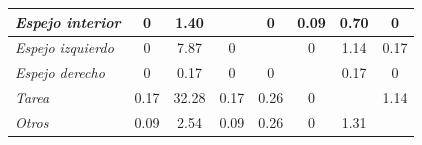\begin{table}[h]
\begin{tabular}{|lccccccc|}
\multicolumn{1}{|l|}{\textit{Espejo interior}}                                                & \multicolumn{1}{c|}{\cellcolor[HTML]{FCFCFF}0}                                           & \multicolumn{1}{c|}{\cellcolor[HTML]{F6F8FE}1.40}  & \multicolumn{1}{c|}{\cellcolor[HTML]{C9C9C9}}                                            & \multicolumn{1}{c|}{\cellcolor[HTML]{FCFCFF}0}                                            & \multicolumn{1}{c|}{\cellcolor[HTML]{FCFCFF}0.09}                                       & \multicolumn{1}{c|}{\cellcolor[HTML]{F9FAFF}0.70}  & \cellcolor[HTML]{FCFCFF}0    \\ \hline
\multicolumn{1}{|l|}{\textit{Espejo izquierdo}}                                               & \multicolumn{1}{c|}{\cellcolor[HTML]{FCFCFF}0}                                           & \multicolumn{1}{c|}{\cellcolor[HTML]{D5E5F5}7.87}  & \multicolumn{1}{c|}{\cellcolor[HTML]{FCFCFF}0}                                           & \multicolumn{1}{c|}{\cellcolor[HTML]{C9C9C9}}                                             & \multicolumn{1}{c|}{\cellcolor[HTML]{FCFCFF}0}                                          & \multicolumn{1}{c|}{\cellcolor[HTML]{F7F9FE}1.14}  & \cellcolor[HTML]{FCFCFF}0.17 \\ \hline
\multicolumn{1}{|l|}{\textit{Espejo derecho}}                                                 & \multicolumn{1}{c|}{\cellcolor[HTML]{FCFCFF}0}                                           & \multicolumn{1}{c|}{\cellcolor[HTML]{FCFCFF}0.17}  & \multicolumn{1}{c|}{\cellcolor[HTML]{FCFCFF}0}                                           & \multicolumn{1}{c|}{\cellcolor[HTML]{FCFCFF}0}                                            & \multicolumn{1}{c|}{\cellcolor[HTML]{C9C9C9}}                                           & \multicolumn{1}{c|}{\cellcolor[HTML]{FCFCFF}0.17}  & \cellcolor[HTML]{FCFCFF}0    \\ \hline
\multicolumn{1}{|l|}{\textit{Tarea}}                                                          & \multicolumn{1}{c|}{\cellcolor[HTML]{FCFCFF}0.17}                                        & \multicolumn{1}{c|}{\cellcolor[HTML]{5B9BD5}32.28} & \multicolumn{1}{c|}{\cellcolor[HTML]{FCFCFF}0.17}                                        & \multicolumn{1}{c|}{\cellcolor[HTML]{FBFCFF}0.26}                                         & \multicolumn{1}{c|}{\cellcolor[HTML]{FCFCFF}0}                                          & \multicolumn{1}{c|}{\cellcolor[HTML]{C9C9C9}}      & \cellcolor[HTML]{F7F9FE}1.14 \\ \hline
\multicolumn{1}{|l|}{\textit{Otros}}                                                          & \multicolumn{1}{c|}{\cellcolor[HTML]{FCFCFF}0.09}                                        & \multicolumn{1}{c|}{\cellcolor[HTML]{F0F5FC}2.54}  & \multicolumn{1}{c|}{\cellcolor[HTML]{FCFCFF}0.09}                                        & \multicolumn{1}{c|}{\cellcolor[HTML]{FBFCFF}0.26}                                         & \multicolumn{1}{c|}{\cellcolor[HTML]{FCFCFF}0}                                          & \multicolumn{1}{c|}{\cellcolor[HTML]{F6F9FE}1.31}  & \cellcolor[HTML]{C9C9C9}     \\ \hline

\end{tabular}
\end{table}
